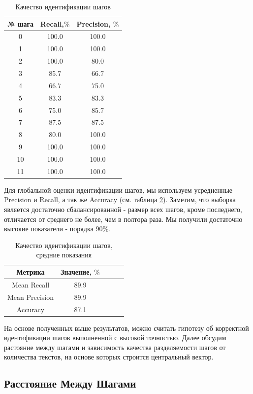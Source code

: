 \documentclass[12pt]{article}
\begin{document}
\begin{table}[h!]
\centering
\begin{tabular}{||c|c|c||} 
 \hline
 № шага & Recall,$\%$ & Precision, $\%$\\
 \hline
 0&   100.0&  100.0\\ 
 1&   100.0&  100.0  \\ 
 2&   100.0&  80.0  \\ 
 3&   85.7&66.7  \\ 
 4&   66.7&  75.0\\ 
 5&   83.3&83.3  \\ 
 6&   75.0&85.7  \\ 
 7&   87.5& 87.5  \\ 
 8&   80.0&100.0  \\ 
 9&   100.0&  100.0  \\ 
 10&   100.0&  100.0  \\ 
 11&   100.0&  100.0  \\ 
 \hline
\end{tabular}
\caption{Качество идентификации шагов}
\label{table:2}
\end{table}

Для глобальной оценки идентификации шагов, мы используем усредненные Precision и Recall, а так же Accuracy (см. таблица \ref{table:3}). Заметим, что выборка является достаточно сбалансированной - размер всех шагов, кроме последнего, отличается от среднего не более, чем в полтора раза. Мы получили достаточно высокие показатели - порядка 90$\%$.

\begin{table}[h!]
\centering
\begin{tabular}{||c|c|c|c|c||} 
 \hline
 Метрика& Значение, $\%$\\
 \hline
Mean Recall&89.9\\
\hline
Mean Precision&89.9\\
\hline
Accuracy&87.1\\
\hline
 \hline
\end{tabular}
\caption{Качество идентификации шагов, средние показания}
\label{table:3}
\end{table}

На основе полученных выше результатов, можно считать гипотезу об корректной идентификации шагов выполненной с высокой точностью. Далее обсудим растояние между шагами и зависимость качества разделяемости шагов от количества текстов, на основе которых строится центральный вектор.

\subsection{Расстояние Между Шагами}
\end{document}
